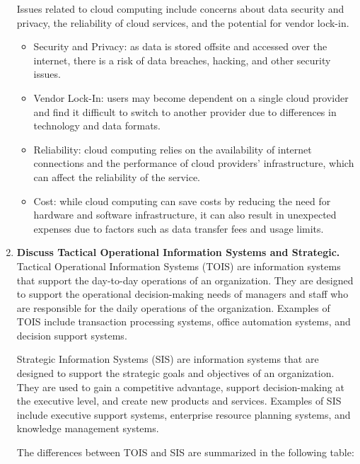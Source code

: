 \documentclass[12pt]{article}
\begin{document}
\begin{enumerate}
Issues related to cloud computing include concerns about data security and privacy, the reliability of cloud services, and the potential for vendor lock-in.
\begin{itemize}
    \item Security and Privacy: as data is stored offsite and accessed over the internet, there is a risk of data breaches, hacking, and other security issues.
    \item Vendor Lock-In: users may become dependent on a single cloud provider and find it difficult to switch to another provider due to differences in technology and data formats.
    \item Reliability: cloud computing relies on the availability of internet connections and the performance of cloud providers' infrastructure, which can affect the reliability of the service.
    \item Cost: while cloud computing can save costs by reducing the need for hardware and software infrastructure, it can also result in unexpected expenses due to factors such as data transfer fees and usage limits.
\end{itemize}
    \item {\bfseries Discuss Tactical Operational Information Systems and Strategic.\\}
    Tactical Operational Information Systems (TOIS) are information systems that support the day-to-day operations of an organization. They are designed to support the operational decision-making needs of managers and staff who are responsible for the daily operations of the organization. Examples of TOIS include transaction processing systems, office automation systems, and decision support systems.
    
    Strategic Information Systems (SIS) are information systems that are designed to support the strategic goals and objectives of an organization. They are used to gain a competitive advantage, support decision-making at the executive level, and create new products and services. Examples of SIS include executive support systems, enterprise resource planning systems, and knowledge management systems.
    
    The differences between TOIS and SIS are summarized in the following table:


\end{enumerate}
\end{document}
